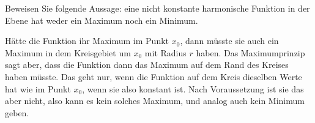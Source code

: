 Beweisen Sie folgende Aussage: eine nicht konstante harmonische Funktion in der
Ebene hat weder ein Maximum noch ein Minimum.

\begin{loesung}
Hätte die Funktion ihr Maximum im Punkt $x_0$, dann müsste
sie auch ein Maximum in dem Kreisgebiet um $x_0$ mit Radius $r$
haben. Das Maximumprinzip sagt aber, dass die Funktion dann das
Maximum auf dem Rand des Kreises haben müsste. Das geht nur,
wenn die Funktion auf dem Kreis dieselben Werte hat wie im
Punkt $x_0$, wenn sie also konstant ist. Nach Voraussetzung ist
sie das aber nicht, also kann es kein solches Maximum, und analog
auch kein Minimum geben.
\end{loesung}

